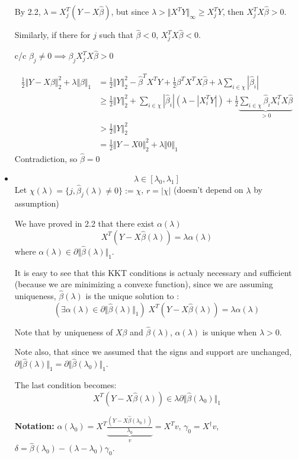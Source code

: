 \documentclass[12pt]{article}
\newcommand{\norm}[1]{\Vert #1 \Vert}
\begin{document}
\begin{itemize}
  By 2.2,  $\lambda = X_j^T (Y - X \hat \beta)$, but since $\lambda > \norm{X^TY}_{\infty} \ge X_j^TY$, then $X_j^TX\hat \beta > 0$.
  
  Similarly, if there for $j$ such that $\hat \beta < 0$, $X_j^TX\hat \beta < 0$.
  
  c/c $\beta_j \ne 0 \implies \beta_j X_j^TX\hat \beta > 0$

  
  \begin{align*}
    \frac12 \norm{Y - X\beta}_2^2 + \lambda \norm{\beta}_1
    &= \frac12 \norm{Y}_2^2 - \hat \beta^TX^TY + \frac12 \beta^T X^TX \hat \beta +  \lambda \sum_{i \in \chi} |\hat \beta_i|
    \\&\ge \frac12 \norm{Y}_2^2 + \sum_{i \in \chi} |\hat \beta_i| (\lambda - |X_i^TY|)
        + \frac12  \underbrace{\sum_{i \in \chi} \hat\beta_i X_i^TX\hat \beta}_{> 0}
    \\&> \frac12 \norm{Y}_2^2
    \\&= \frac12 \norm{Y - X0}_2^2 + \lambda\norm{0}_1
  \end{align*}
  Contradiction, so $\hat \beta = 0$
\item
  $$\lambda \in [\lambda_0, \lambda_1]$$
  Let $\chi(\lambda) = \{ j, \hat \beta_j(\lambda) \ne 0 \} := \chi$, $r = |\chi|$ (doesn't depend on $\lambda$ by assumption)

  We have proved in 2.2 that there exist $\alpha(\lambda)$
  $$X^T(Y - X\hat \beta(\lambda)) = \lambda \alpha(\lambda) $$
  where $\alpha(\lambda) \in \partial \norm{\hat \beta(\lambda)}_1$.

  It is easy to see that this KKT conditions is actualy necessary and sufficient (because we are minimizing a convexe function), since we are assuming uniqueness, $\hat \beta(\lambda)$ is the unique solution to :
  $$(\exists \alpha(\lambda) \in \partial \norm{\hat \beta(\lambda)}_1) \; X^T(Y - X\hat \beta(\lambda)) = \lambda \alpha(\lambda) $$
  
  Note that by uniqueness of $X\beta$ and $\hat \beta(\lambda)$, $\alpha(\lambda)$ is unique when $\lambda > 0$.
  
  Note also, that since we assumed that the signs and support are unchanged, $\partial \norm{\hat \beta(\lambda)}_1 = \partial \norm{\hat \beta(\lambda_0)}_1$.
  
  The last condition becomes:
  $$X^T(Y - X\hat \beta(\lambda)) \in \lambda \partial \norm{\hat \beta(\lambda_0)}_1$$


  \textbf{Notation: } $ \alpha(\lambda_0) =  X^T \underbrace{\frac{(Y - X\hat \beta(\lambda_0))}{\lambda_0}}_v = X^Tv$,  $\gamma_0 = X^{\dagger} v$, $\delta = \hat \beta(\lambda_0) - (\lambda - \lambda_0) \gamma_0$. 


\end{itemize}
\end{document}
